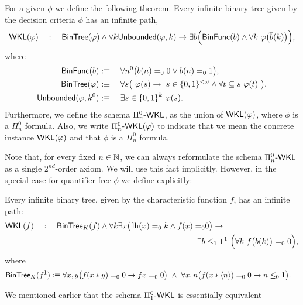 \begin{dfn} \label{l:WKL-Feferman}
For a given $\phi$ we define the following theorem. 
Every infinite binary tree given by the decision criteria $\phi$
 has an infinite path,
\[
\textsf{\upshape WKL}(\varphi)\quad:\quad  \textsf{\upshape BinTree}(\varphi) \wedge \forall k \textsf{\upshape Unbounded}(\varphi,k) 
     \rightarrow \exists b\Big(\textsf{\upshape BinFunc}(b)\wedge\forall k\ \varphi\big(\bar{b}(k)\big)\Big)\text{,}
\]where
\begin{align*}
\BFunc(b)&:\equiv\quad \forall n^0\big(b(n)=_00 \vee b(n)=_01\big)\text{,}\\
\BTree(\phi)&:\equiv\quad \forall s \big(\ 
   \phi(s) 
      \rightarrow
 \ s\in\{0,1\}^{<\omega}
   \wedge 
   \forall t\subseteq s\ \phi(t)\ \big)\text{,}\\
\UnBounded(\phi,k^0)&:\equiv\quad 
  \exists s\in\{0,1\}^{k}\ \phi(s)\text{.}
\end{align*}
Furthermore, we define the schema $\Pi_n^0\textsf{\upshape -}\textsf{\upshape WKL}$, as the union of $\textsf{\upshape WKL}(\varphi)$, where
$\phi$ is a $\Pi_n^0$ formula. Also, we write $\Pi_n^0\textsf{\upshape -}\textsf{\upshape WKL}(\varphi)$ to indicate
that we mean the concrete instance $\textsf{\upshape WKL}(\varphi)$ and that $\phi$ is a $\Pi_n^0$ formula.  \\
\end{dfn}
%
%
Note that, for every fixed $n \in \mathbb{N}$, we can always reformulate
the schema $\Pi^0_n\textsf{\upshape -}\textsf{\upshape WKL}$ as a single $2^{nd}$-order axiom. 
We will use this fact implicitly.
However, in the special case for quantifier-free $\phi$ 
we define explicitly:
\begin{dfn} 
\label{l:WKLdelta}
Every infinite binary tree, given by the characteristic function $f$,
 has an infinite path:
\begin{align*}
\textsf{\upshape WKL}(f)\quad:\quad\textsf{\upshape BinTree}_K(f) \wedge \forall k\exists x \big(\operatorname{lh}(x)=_0k \wedge f(x)=_0&0\big) 
     \rightarrow\\
 \exists b&\leq_1\mathbf1^1\ \Big(\forall k\ f\big(\bar{b}(k)\big)=_00\Big)\text{,}
\end{align*}
where
\begin{align*}
\BTree_K(f^1)&:\equiv 
  \forall x,y \big(f(x*y)=_00\rightarrow fx=_00\big)\ \wedge\ 
  \forall x,n\big(f(x*\langle n\rangle)=_00\rightarrow n\leq_0 1\big)\text{.}
\end{align*}
\end{dfn}
We mentioned earlier that the schema $\Pi^0_1\textsf{\upshape -}\textsf{\upshape WKL}$ is essentially equivalent
